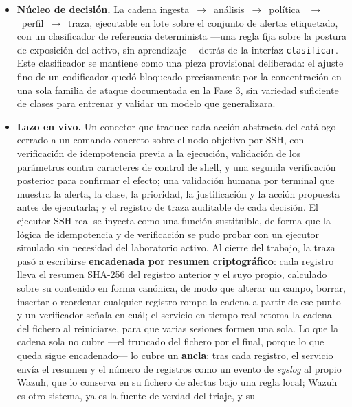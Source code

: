 \begin{itemize}
  \item \textbf{Núcleo de decisión.} La cadena ingesta~$\rightarrow$~análisis~$\rightarrow$~política~
        $\rightarrow$~perfil~$\rightarrow$~traza, ejecutable en lote sobre el conjunto de alertas
        etiquetado, con un clasificador de referencia determinista ---una regla fija sobre la postura
        de exposición del activo, sin aprendizaje--- detrás de la interfaz \texttt{clasificar}. Este
        clasificador se mantiene como una pieza provisional deliberada: el ajuste fino de un
        codificador quedó bloqueado precisamente por la concentración en una sola familia de ataque
        documentada en la Fase 3, sin variedad suficiente de clases para entrenar y validar un
        modelo que generalizara.
  \item \textbf{Lazo en vivo.} Un conector que traduce cada acción abstracta del catálogo cerrado a
        un comando concreto sobre el nodo objetivo por SSH, con verificación de idempotencia previa
        a la ejecución, validación de los parámetros contra caracteres de control de shell, y una
        segunda verificación posterior para confirmar el efecto; una validación humana por terminal
        que muestra la alerta, la clase, la prioridad, la justificación y la acción propuesta antes
        de ejecutarla; y el registro de traza auditable de cada decisión. El ejecutor SSH real se
        inyecta como una función sustituible, de forma que la lógica de idempotencia y de
        verificación se pudo probar con un ejecutor simulado sin necesidad del laboratorio activo.
        Al cierre del trabajo, la traza pasó a escribirse \textbf{encadenada por resumen
        criptográfico}: cada registro lleva el resumen SHA-256 del registro anterior y el suyo
        propio, calculado sobre su contenido en forma canónica, de modo que alterar un campo,
        borrar, insertar o reordenar cualquier registro rompe la cadena a partir de ese punto y un
        verificador señala en cuál; el servicio en tiempo real retoma la cadena del fichero al
        reiniciarse, para que varias sesiones formen una sola. Lo que la cadena sola no cubre ---el
        truncado del fichero por el final, porque lo que queda sigue encadenado--- lo cubre un
        \textbf{ancla}: tras cada registro, el servicio envía el resumen y el número de registros
        como un evento de \emph{syslog} al propio Wazuh, que lo conserva en su fichero de alertas
        bajo una regla local; Wazuh es otro sistema, ya es la fuente de verdad del triaje, y su

\end{itemize}
